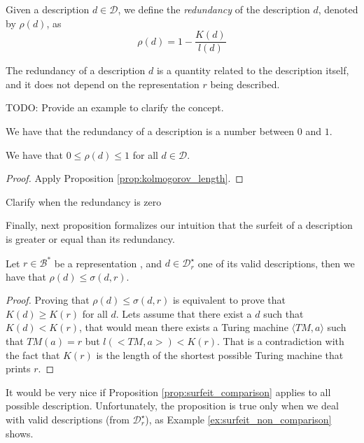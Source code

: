 \begin{definition}[Redundancy]
Given a description $d \in \mathcal{D}$, we define the \emph{redundancy} of the description $d$, denoted by $\rho(d)$, as
\[
\rho(d) = 1 - \frac{K(d)}{l(d)}
\]
\end{definition}

The redundancy of a description $d$ is a quantity related to the description itself, and it does not depend on the representation $r$ being described.

\begin{example}
{\color{red} TODO: Provide an example to clarify the concept.}
\end{example}

We have that the redundancy of a description is  a number between $0$ and $1$.

\begin{proposition}
We have that $0 \leq \rho(d) \leq 1$ for all $d \in \mathcal{D}$.
\end{proposition}
\begin{proof}
Apply Proposition \ref{prop:kolmogorov_length}.
\end{proof}

{\color{red} Clarify when the redundancy is zero}

Finally, next proposition formalizes our intuition that the surfeit of a description is greater or equal than its redundancy.

\begin{proposition}
\label{prop:surfeit_comparison}
Let $r \in \mathcal{B}^\ast$ be a representation , and $d \in \mathcal{D}^\star_r$ one of its valid descriptions, then we have that $\rho(d) \leq \sigma(d, r)$.
\end{proposition}
\begin{proof}
Proving that $\rho(d) \leq \sigma(d, r)$ is equivalent to prove that $K(d) \geq K(r)$ for all $d$. Lets assume that there exist a $d$ such that $K(d) < K(r)$, that would mean there exists a Turing machine $\langle TM, a \rangle$ such that $TM(a)=r$ but $l(<TM, a>) < K(r)$. That is a contradiction with the fact that $K(r)$ is the length of the shortest possible Turing machine that prints $r$.
\end{proof}

It would be very nice if Proposition \ref{prop:surfeit_comparison} applies to all possible description. Unfortunately, the proposition is true only when we deal with valid descriptions (from $\mathcal{D}^\star_r$), as Example \ref{ex:surfeit_non_comparison} shows.

